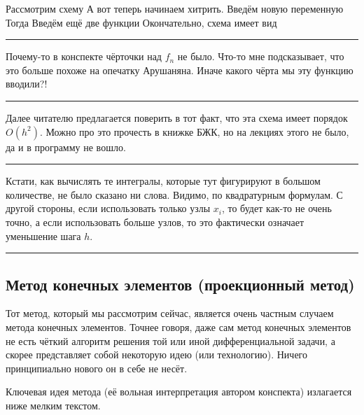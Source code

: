 \documentclass[a4paper]{article}
\newenvironment{petit}{\medskip\hrule\smallskip\footnotesize}{\par\smallskip\hrule\medskip}
\begin{document}
Рассмотрим схему
А вот теперь начинаем хитрить. Введём новую переменную
Тогда
Введём ещё две функции
Окончательно, схема имеет вид

\begin{petit}
Почему-то в конспекте чёрточки над $f_n$ не было. Что-то мне подсказывает, что это больше похоже на опечатку Арушаняна.
Иначе какого чёрта мы эту функцию вводили?!
\end{petit}

Далее читателю предлагается поверить в тот факт, что эта схема имеет порядок $O(h^2)$.
Можно про это прочесть в книжке БЖК, но  на лекциях этого не было, да и в программу не вошло.

\begin{petit}
Кстати, как вычислять те интегралы, которые тут фигурируют в большом количестве, не было сказано ни слова.
Видимо, по квадратурным формулам. С другой стороны, если использовать только узлы $x_i$, то будет как-то не очень точно,
а если использовать больше узлов, то это фактически означает уменьшение шага $h$.
\end{petit}






\subsection{Метод конечных элементов (проекционный метод)}

Тот метод, который мы рассмотрим сейчас, является очень частным случаем метода конечных элементов.
Точнее говоря, даже сам метод конечных элементов не есть чёткий алгоритм решения той или иной дифференциальной задачи,
а скорее представляет собой некоторую идею (или технологию). Ничего принципиально нового он в себе не несёт.

Ключевая идея метода ( её вольная интерпретация автором конспекта) излагается ниже мелким текстом.
\end{document}

